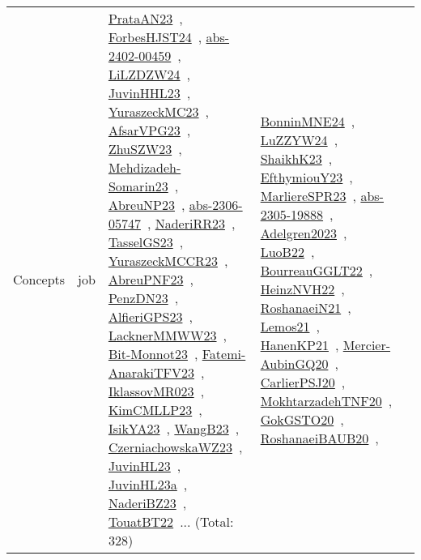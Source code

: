 {\begin{longtable}{lp{3cm}>{\raggedright\arraybackslash}p{6cm}>{\raggedright\arraybackslash}p{6cm}>{\raggedright\arraybackslash}p{8cm}}
\index{job}\index{Concepts!job}Concepts & job & \href{../works/PrataAN23.pdf}{PrataAN23}~\cite{PrataAN23}, \href{../works/ForbesHJST24.pdf}{ForbesHJST24}~\cite{ForbesHJST24}, \href{../works/abs-2402-00459.pdf}{abs-2402-00459}~\cite{abs-2402-00459}, \href{../works/LiLZDZW24.pdf}{LiLZDZW24}~\cite{LiLZDZW24}, \href{../works/JuvinHHL23.pdf}{JuvinHHL23}~\cite{JuvinHHL23}, \href{../works/YuraszeckMC23.pdf}{YuraszeckMC23}~\cite{YuraszeckMC23}, \href{../works/AfsarVPG23.pdf}{AfsarVPG23}~\cite{AfsarVPG23}, \href{../works/ZhuSZW23.pdf}{ZhuSZW23}~\cite{ZhuSZW23}, \href{../works/Mehdizadeh-Somarin23.pdf}{Mehdizadeh-Somarin23}~\cite{Mehdizadeh-Somarin23}, \href{../works/AbreuNP23.pdf}{AbreuNP23}~\cite{AbreuNP23}, \href{../works/abs-2306-05747.pdf}{abs-2306-05747}~\cite{abs-2306-05747}, \href{../works/NaderiRR23.pdf}{NaderiRR23}~\cite{NaderiRR23}, \href{../works/TasselGS23.pdf}{TasselGS23}~\cite{TasselGS23}, \href{../works/YuraszeckMCCR23.pdf}{YuraszeckMCCR23}~\cite{YuraszeckMCCR23}, \href{../works/AbreuPNF23.pdf}{AbreuPNF23}~\cite{AbreuPNF23}, \href{../works/PenzDN23.pdf}{PenzDN23}~\cite{PenzDN23}, \href{../works/AlfieriGPS23.pdf}{AlfieriGPS23}~\cite{AlfieriGPS23}, \href{../works/LacknerMMWW23.pdf}{LacknerMMWW23}~\cite{LacknerMMWW23}, \href{../works/Bit-Monnot23.pdf}{Bit-Monnot23}~\cite{Bit-Monnot23}, \href{../works/Fatemi-AnarakiTFV23.pdf}{Fatemi-AnarakiTFV23}~\cite{Fatemi-AnarakiTFV23}, \href{../works/IklassovMR023.pdf}{IklassovMR023}~\cite{IklassovMR023}, \href{../works/KimCMLLP23.pdf}{KimCMLLP23}~\cite{KimCMLLP23}, \href{../works/IsikYA23.pdf}{IsikYA23}~\cite{IsikYA23}, \href{../works/WangB23.pdf}{WangB23}~\cite{WangB23}, \href{../works/CzerniachowskaWZ23.pdf}{CzerniachowskaWZ23}~\cite{CzerniachowskaWZ23}, \href{../works/JuvinHL23.pdf}{JuvinHL23}~\cite{JuvinHL23}, \href{../works/JuvinHL23a.pdf}{JuvinHL23a}~\cite{JuvinHL23a}, \href{../works/NaderiBZ23.pdf}{NaderiBZ23}~\cite{NaderiBZ23}, \href{../works/TouatBT22.pdf}{TouatBT22}~\cite{TouatBT22}... (Total: 328) & \href{../works/BonninMNE24.pdf}{BonninMNE24}~\cite{BonninMNE24}, \href{../works/LuZZYW24.pdf}{LuZZYW24}~\cite{LuZZYW24}, \href{../works/ShaikhK23.pdf}{ShaikhK23}~\cite{ShaikhK23}, \href{../works/EfthymiouY23.pdf}{EfthymiouY23}~\cite{EfthymiouY23}, \href{../works/MarliereSPR23.pdf}{MarliereSPR23}~\cite{MarliereSPR23}, \href{../works/abs-2305-19888.pdf}{abs-2305-19888}~\cite{abs-2305-19888}, \href{../works/Adelgren2023.pdf}{Adelgren2023}~\cite{Adelgren2023}, \href{../works/LuoB22.pdf}{LuoB22}~\cite{LuoB22}, \href{../works/BourreauGGLT22.pdf}{BourreauGGLT22}~\cite{BourreauGGLT22}, \href{../works/HeinzNVH22.pdf}{HeinzNVH22}~\cite{HeinzNVH22}, \href{../works/RoshanaeiN21.pdf}{RoshanaeiN21}~\cite{RoshanaeiN21}, \href{../works/Lemos21.pdf}{Lemos21}~\cite{Lemos21}, \href{../works/HanenKP21.pdf}{HanenKP21}~\cite{HanenKP21}, \href{../works/Mercier-AubinGQ20.pdf}{Mercier-AubinGQ20}~\cite{Mercier-AubinGQ20}, \href{../works/CarlierPSJ20.pdf}{CarlierPSJ20}~\cite{CarlierPSJ20}, \href{../works/MokhtarzadehTNF20.pdf}{MokhtarzadehTNF20}~\cite{MokhtarzadehTNF20}, \href{../works/GokGSTO20.pdf}{GokGSTO20}~\cite{GokGSTO20}, \href{../works/RoshanaeiBAUB20.pdf}{RoshanaeiBAUB20}~\cite{RoshanaeiBAUB20}, 
\end{longtable}}
